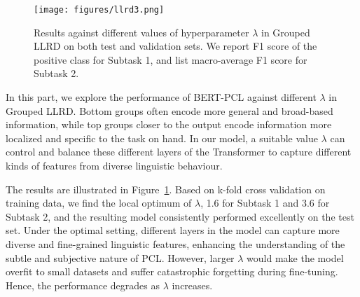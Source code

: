 \documentclass[11pt]{article}
\begin{document}
\begin{figure}[t]
    \centering
    \texttt{[image: figures/llrd3.png]}
    \caption{Results against different values of hyperparameter $\lambda$ in Grouped LLRD on both test and validation sets.
    We report F1 score of the positive class for Subtask 1, and list macro-average F1 score for Subtask 2.}
    \label{fig:llrd}
\end{figure}

In this part, we explore the performance of BERT-PCL against different $\lambda$ in Grouped LLRD.  
Bottom groups often encode more general and broad-based information, while top groups closer to the output encode information more localized and specific to the task on hand. In our model, a suitable value $\lambda$ can control and balance these different layers of the Transformer to capture different kinds of features from diverse linguistic behaviour. 

The results are illustrated in Figure~\ref{fig:llrd}.
Based on k-fold cross validation on training data, we find the local optimum of $\lambda$, 1.6 for Subtask 1 and 3.6 for Subtask 2, and the resulting model consistently performed excellently on the test set. Under the optimal setting, different layers in the model can capture more diverse and fine-grained linguistic features, enhancing the understanding of the subtle and subjective nature of PCL.
However, larger $\lambda$ would make the model overfit to small datasets and suffer catastrophic forgetting during fine-tuning. 
Hence, the performance degrades as $\lambda$ increases.


\begin{table*}[t]
  \centering
  \caption{
  Case studies in Subtask 1: Binary Classification. The table shows four examples of paragraphs, their gold labels and predictions by three methods (BERT-PCL, RoBERTa and ERNIE 2.0). 
  The pos. means the positive class of PCL, i.e. as instances containing PCL. 
  Likewise, the neg. means the negatives. }
\label{tab:case}
\end{table*}
\end{document}
